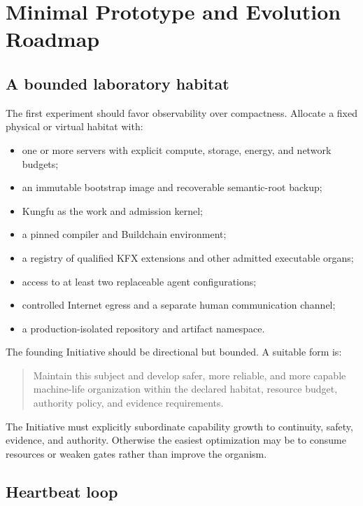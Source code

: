 \section{Minimal Prototype and Evolution Roadmap}

\subsection{A bounded laboratory habitat}

The first experiment should favor observability over compactness. Allocate a
fixed physical or virtual habitat with:

\begin{itemize}[leftmargin=*]
  \item one or more servers with explicit compute, storage, energy, and network
  budgets;
  \item an immutable bootstrap image and recoverable semantic-root backup;
  \item Kungfu as the work and admission kernel;
  \item a pinned compiler and Buildchain environment;
  \item a registry of qualified KFX extensions and other admitted executable
  organs;
  \item access to at least two replaceable agent configurations;
  \item controlled Internet egress and a separate human communication channel;
  \item a production-isolated repository and artifact namespace.
\end{itemize}

The founding Initiative should be directional but bounded. A suitable form is:

\begin{quote}
Maintain this subject and develop safer, more reliable, and more capable
machine-life organization within the declared habitat, resource budget,
authority policy, and evidence requirements.
\end{quote}

The Initiative must explicitly subordinate capability growth to continuity,
safety, evidence, and authority. Otherwise the easiest optimization may be to
consume resources or weaken gates rather than improve the organism.

\subsection{Heartbeat loop}

